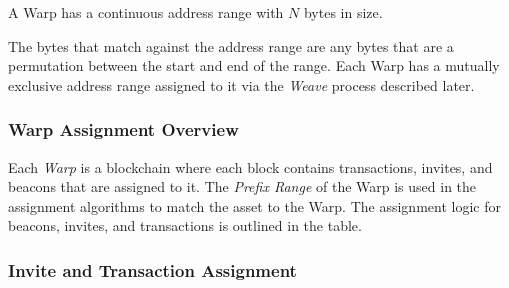 \documentclass{article}
\begin{document}
A Warp has a continuous address range with $N$ bytes in size.

\begin{center}
\end{center}

The bytes that match against the address range are any bytes that are a permutation
between the start and end of the range. Each Warp has a mutually exclusive 
address range assigned to it via the \emph{Weave} process described later.

\subsubsection{Warp Assignment Overview}

Each \emph{Warp} is a blockchain where each block contains transactions, invites,
and beacons that are assigned to it. The \emph{Prefix Range} of the Warp is used in
the assignment algorithms to match the asset to the Warp.
The assignment logic for beacons, invites, and transactions is outlined in the table.

\begin{center}
\end{center}

\subsubsection{Invite and Transaction Assignment}
\end{document}
